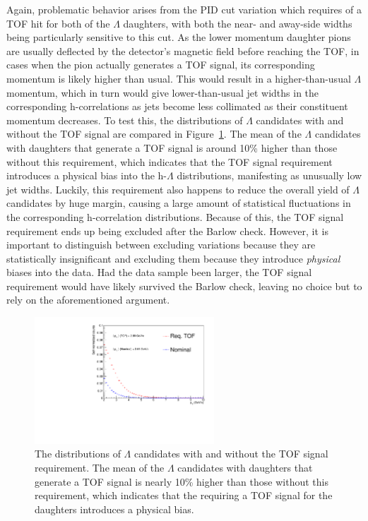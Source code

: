 Again, problematic behavior arises from the PID cut variation which requires of a TOF hit for both of the $\Lambda$ daughters, with both the near- and away-side widths being particularly sensitive to this cut. As the lower momentum daughter pions are usually deflected by the detector's magnetic field before reaching the TOF, in cases when the pion actually generates a TOF signal, its corresponding momentum is likely higher than usual. This would result in a higher-than-usual $\Lambda$ momentum, which in turn would give lower-than-usual jet widths in the corresponding h-\lmb correlations as jets become less collimated as their constituent momentum decreases. To test this, the \pt distributions of $\Lambda$ candidates with and without the TOF signal are compared in Figure~\ref{fig:tof_momentum_bias}. The mean \pt of the $\Lambda$ candidates with daughters that generate a TOF signal is around 10\% higher than those without this requirement, which indicates that the TOF signal requirement introduces a physical bias into the h-$\Lambda$ \dphi distributions, manifesting as unusually low jet widths. Luckily, this requirement also happens to reduce the overall yield of $\Lambda$ candidates by huge margin, causing a large amount of statistical fluctuations in the corresponding h-\lmb correlation distributions. Because of this, the TOF signal requirement ends up being excluded after the Barlow check. However, it is important to distinguish between excluding variations because they are statistically insignificant and excluding them because they introduce \textit{physical} biases into the data. Had the data sample been larger, the TOF signal requirement would have likely survived the Barlow check, leaving no choice but to rely on the aforementioned argument.

\begin{figure}[t]
    \centering
    \includegraphics[width=0.6\textwidth]{figures/analysis/quick_tof_pt_check.pdf}
    \caption{The \pt distributions of $\Lambda$ candidates with and without the TOF signal requirement. The mean \pt of the $\Lambda$ candidates with daughters that generate a TOF signal is nearly 10\% higher than those without this requirement, which indicates that the requiring a TOF signal for the \lmb daughters introduces a physical bias.}
    \label{fig:tof_momentum_bias}
\end{figure}

